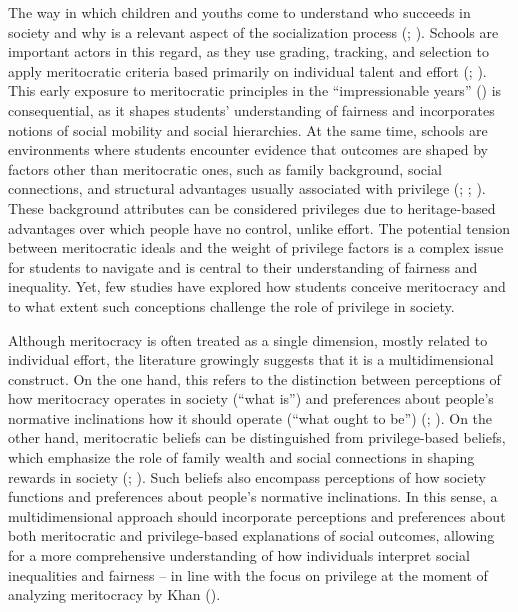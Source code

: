 \documentclass[
  13pt,
]{article}
\begin{document}
The way in which children and youths come to understand who succeeds in
society and why is a relevant aspect of the socialization process
(;
). Schools are
important actors in this regard, as they use grading, tracking, and
selection to apply meritocratic criteria based primarily on individual
talent and effort (; ). This
early exposure to meritocratic principles in the ``impressionable
years'' () is
consequential, as it shapes students' understanding of fairness and
incorporates notions of social mobility and social hierarchies. At the
same time, schools are environments where students encounter evidence
that outcomes are shaped by factors other than meritocratic ones, such
as family background, social connections, and structural advantages
usually associated with privilege
(;
;
). These
background attributes can be considered privileges due to heritage-based
advantages over which people have no control, unlike effort. The
potential tension between meritocratic ideals and the weight of
privilege factors is a complex issue for students to navigate and is
central to their understanding of fairness and inequality. Yet, few
studies have explored how students conceive meritocracy and to what
extent such conceptions challenge the role of privilege in society.

Although meritocracy is often treated as a single dimension, mostly
related to individual effort, the literature growingly suggests that it
is a multidimensional construct. On the one hand, this refers to the
distinction between perceptions of how meritocracy operates in society
(``what is'') and preferences about people's normative inclinations how
it should operate (``what ought to be'')
(;
). On
the other hand, meritocratic beliefs can be distinguished from
privilege-based beliefs, which emphasize the role of family wealth and
social connections in shaping rewards in society
(;
). Such beliefs
also encompass perceptions of how society functions and preferences
about people's normative inclinations. In this sense, a multidimensional
approach should incorporate perceptions and preferences about both
meritocratic and privilege-based explanations of social outcomes,
allowing for a more comprehensive understanding of how individuals
interpret social inequalities and fairness -- in line with the focus on
privilege at the moment of analyzing meritocracy by Khan
().
\end{document}
